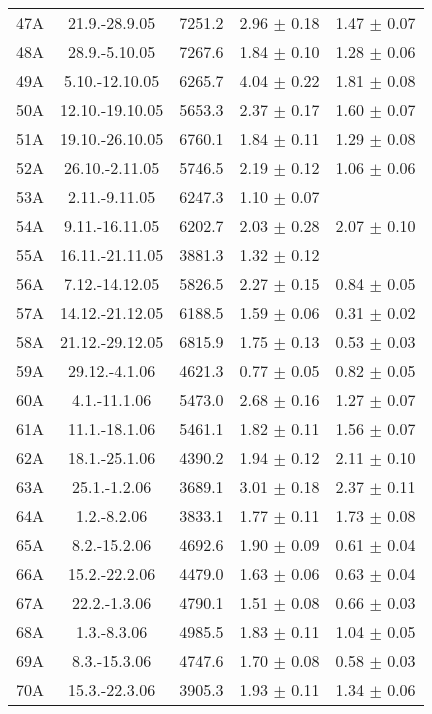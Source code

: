 \documentclass[a4paper,12pt]{article}
\begin{document}
\begin{center}
\begin{longtable}{|c|c|c|c|c|}
    47A	&	21.9.-28.9.05	&	7251.2	&	2.96 $\pm$ 0.18	&	1.47 $\pm$ 0.07	\\
    48A	&	28.9.-5.10.05	&	7267.6	&	1.84 $\pm$ 0.10	&	1.28 $\pm$ 0.06	\\
    49A	&	5.10.-12.10.05	&	6265.7	&	4.04 $\pm$ 0.22	&	1.81 $\pm$ 0.08	\\
    50A	&	12.10.-19.10.05	&	5653.3	&	2.37 $\pm$ 0.17	&	1.60 $\pm$ 0.07	\\
    51A	&	19.10.-26.10.05	&	6760.1	&	1.84 $\pm$ 0.11	&	1.29 $\pm$ 0.08	\\
    52A	&	26.10.-2.11.05	&	5746.5	&	2.19 $\pm$ 0.12	&	1.06 $\pm$ 0.06	\\
    53A	&	2.11.-9.11.05	&	6247.3	&	1.10 $\pm$ 0.07	&		\\
    54A	&	9.11.-16.11.05	&	6202.7	&	2.03 $\pm$ 0.28	&	2.07 $\pm$ 0.10	\\
    55A	&	16.11.-21.11.05	&	3881.3	&	1.32 $\pm$ 0.12	&		\\
    56A	&	7.12.-14.12.05	&	5826.5	&	2.27 $\pm$ 0.15	&	0.84 $\pm$ 0.05	\\
    57A	&	14.12.-21.12.05	&	6188.5	&	1.59 $\pm$ 0.06	&	0.31 $\pm$ 0.02	\\
    58A	&	21.12.-29.12.05	&	6815.9	&	1.75 $\pm$ 0.13	&	0.53 $\pm$ 0.03	\\
    59A	&	29.12.-4.1.06	&	4621.3	&	0.77 $\pm$ 0.05	&	0.82 $\pm$ 0.05	\\
    60A	&	4.1.-11.1.06	&	5473.0	&	2.68 $\pm$ 0.16	&	1.27 $\pm$ 0.07	\\
    61A	&	11.1.-18.1.06	&	5461.1	&	1.82 $\pm$ 0.11	&	1.56 $\pm$ 0.07	\\
    62A	&	18.1.-25.1.06	&	4390.2	&	1.94 $\pm$ 0.12	&	2.11 $\pm$ 0.10	\\
    63A	&	25.1.-1.2.06	&	3689.1	&	3.01 $\pm$ 0.18	&	2.37 $\pm$ 0.11	\\
    64A	&	1.2.-8.2.06	&	3833.1	&	1.77 $\pm$ 0.11	&	1.73 $\pm$ 0.08	\\
    65A	&	8.2.-15.2.06	&	4692.6	&	1.90 $\pm$ 0.09	&	0.61 $\pm$ 0.04	\\
    66A	&	15.2.-22.2.06	&	4479.0	&	1.63 $\pm$ 0.06	&	0.63 $\pm$ 0.04	\\
    67A	&	22.2.-1.3.06	&	4790.1	&	1.51 $\pm$ 0.08	&	0.66 $\pm$ 0.03	\\
    68A	&	1.3.-8.3.06	&	4985.5	&	1.83 $\pm$ 0.11	&	1.04 $\pm$ 0.05	\\
    69A	&	8.3.-15.3.06	&	4747.6	&	1.70 $\pm$ 0.08	&	0.58 $\pm$ 0.03	\\
    70A	&	15.3.-22.3.06	&	3905.3	&	1.93 $\pm$ 0.11	&	1.34 $\pm$ 0.06	\\

\end{longtable}
\end{center}
\end{document}
